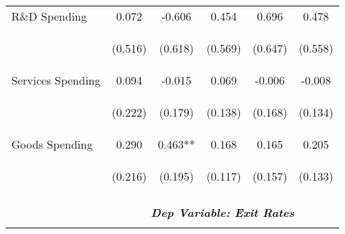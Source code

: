 \begin{tabular}{lccccc}
    R\&D Spending & 0.072 & -0.606 & 0.454 & 0.696 & 0.478 \\
    & \begin{footnotesize}(0.516)\end{footnotesize} & \begin{footnotesize}(0.618)\end{footnotesize} & \begin{footnotesize}(0.569)\end{footnotesize} & \begin{footnotesize}(0.647)\end{footnotesize} & \begin{footnotesize}(0.558)\end{footnotesize} \\
    Services Spending & 0.094 & -0.015 & 0.069 & -0.006 & -0.008 \\
    & \begin{footnotesize}(0.222)\end{footnotesize} & \begin{footnotesize}(0.179)\end{footnotesize} & \begin{footnotesize}(0.138)\end{footnotesize} & \begin{footnotesize}(0.168)\end{footnotesize} & \begin{footnotesize}(0.134)\end{footnotesize} \\
    Goods Spending & 0.290 & 0.463** & 0.168 & 0.165 & 0.205 \\
    & \begin{footnotesize}(0.216)\end{footnotesize} & \begin{footnotesize}(0.195)\end{footnotesize} & \begin{footnotesize}(0.117)\end{footnotesize} & \begin{footnotesize}(0.157)\end{footnotesize} & \begin{footnotesize}(0.133)\end{footnotesize} \\
    
    \cmidrule{2-6}
    \vspace{-1.5pt} & \vspace{-1.5pt} & \vspace{-1.5pt} & \vspace{-1.5pt} & \vspace{-1.5pt} \\
    & \multicolumn{5}{c}{\textit{\textbf{Dep Variable: Exit Rates}}} \\ 
    \vspace{-1.5pt} & \vspace{-1.5pt} & \vspace{-1.5pt} & \vspace{-1.5pt} & \vspace{-1.5pt} \\
    \cmidrule{2-6}
    

\end{tabular}
